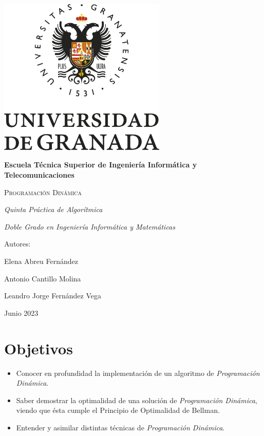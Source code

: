 \documentclass[a4paper,12pt,twoside]{article} %
\begin{document}
\begin{titlepage}
\centering

{\includegraphics[width=0.6\textwidth]{foto_portada.png}\par}
\vspace{1cm}

{\bfseries\LARGE Escuela Técnica Superior de Ingeniería Informática y Telecomunicaciones \par}
\vspace{0.4cm}

{\scshape\Huge Programación Dinámica \par}
\vspace{0.4cm}

{\itshape\Large Quinta Práctica de Algorítmica \par}
\vspace{0.5cm}

{\itshape\Large Doble Grado en Ingeniería Informática y Matemáticas \par}
\vspace{0.4cm}

{\Large Autores: \par}
{\Large Elena Abreu Fernández \par}
{\Large Antonio Cantillo Molina \par}
{\Large Leandro Jorge Fernández Vega \par}
\vfill

{\Large Junio 2023 \par}

\end{titlepage}

\tableofcontents
\newpage


\section{Objetivos}
	\begin{itemize}
		\item Conocer en profundidad la implementación de un algoritmo de \textit{Programación Dinámica}.
		\item Saber demostrar la optimalidad de una solución de \textit{Programación Dinámica}, viendo que ésta cumple el Principio de Optimalidad de Bellman.
            \item Entender y asimilar distintas técnicas de \textit{Programación Dinámica}.
	\end{itemize}
\newpage
\end{document}
